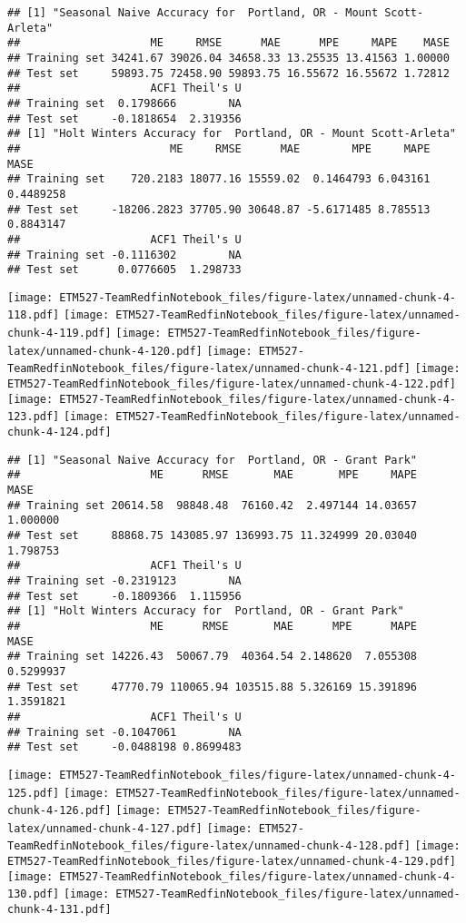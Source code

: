 \documentclass[]{article}
\begin{document}
\begin{verbatim}
## [1] "Seasonal Naive Accuracy for  Portland, OR - Mount Scott-Arleta"
##                    ME     RMSE      MAE      MPE     MAPE    MASE
## Training set 34241.67 39026.04 34658.33 13.25535 13.41563 1.00000
## Test set     59893.75 72458.90 59893.75 16.55672 16.55672 1.72812
##                    ACF1 Theil's U
## Training set  0.1798666        NA
## Test set     -0.1818654  2.319356
## [1] "Holt Winters Accuracy for  Portland, OR - Mount Scott-Arleta"
##                       ME     RMSE      MAE        MPE     MAPE      MASE
## Training set    720.2183 18077.16 15559.02  0.1464793 6.043161 0.4489258
## Test set     -18206.2823 37705.90 30648.87 -5.6171485 8.785513 0.8843147
##                    ACF1 Theil's U
## Training set -0.1116302        NA
## Test set      0.0776605  1.298733
\end{verbatim}

\texttt{[image: ETM527-TeamRedfinNotebook\_files/figure-latex/unnamed-chunk-4-118.pdf]}
\texttt{[image: ETM527-TeamRedfinNotebook\_files/figure-latex/unnamed-chunk-4-119.pdf]}
\texttt{[image: ETM527-TeamRedfinNotebook\_files/figure-latex/unnamed-chunk-4-120.pdf]}
\texttt{[image: ETM527-TeamRedfinNotebook\_files/figure-latex/unnamed-chunk-4-121.pdf]}
\texttt{[image: ETM527-TeamRedfinNotebook\_files/figure-latex/unnamed-chunk-4-122.pdf]}
\texttt{[image: ETM527-TeamRedfinNotebook\_files/figure-latex/unnamed-chunk-4-123.pdf]}
\texttt{[image: ETM527-TeamRedfinNotebook\_files/figure-latex/unnamed-chunk-4-124.pdf]}

\begin{verbatim}
## [1] "Seasonal Naive Accuracy for  Portland, OR - Grant Park"
##                    ME      RMSE       MAE       MPE     MAPE     MASE
## Training set 20614.58  98848.48  76160.42  2.497144 14.03657 1.000000
## Test set     88868.75 143085.97 136993.75 11.324999 20.03040 1.798753
##                    ACF1 Theil's U
## Training set -0.2319123        NA
## Test set     -0.1809366  1.115956
## [1] "Holt Winters Accuracy for  Portland, OR - Grant Park"
##                    ME      RMSE       MAE      MPE      MAPE      MASE
## Training set 14226.43  50067.79  40364.54 2.148620  7.055308 0.5299937
## Test set     47770.79 110065.94 103515.88 5.326169 15.391896 1.3591821
##                    ACF1 Theil's U
## Training set -0.1047061        NA
## Test set     -0.0488198 0.8699483
\end{verbatim}

\texttt{[image: ETM527-TeamRedfinNotebook\_files/figure-latex/unnamed-chunk-4-125.pdf]}
\texttt{[image: ETM527-TeamRedfinNotebook\_files/figure-latex/unnamed-chunk-4-126.pdf]}
\texttt{[image: ETM527-TeamRedfinNotebook\_files/figure-latex/unnamed-chunk-4-127.pdf]}
\texttt{[image: ETM527-TeamRedfinNotebook\_files/figure-latex/unnamed-chunk-4-128.pdf]}
\texttt{[image: ETM527-TeamRedfinNotebook\_files/figure-latex/unnamed-chunk-4-129.pdf]}
\texttt{[image: ETM527-TeamRedfinNotebook\_files/figure-latex/unnamed-chunk-4-130.pdf]}
\texttt{[image: ETM527-TeamRedfinNotebook\_files/figure-latex/unnamed-chunk-4-131.pdf]}
\end{document}
